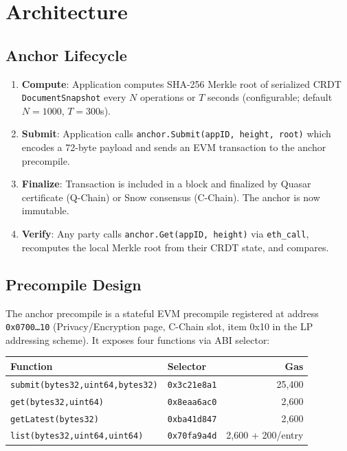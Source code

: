\section{Architecture}

\label{sec:architecture}

\subsection{Anchor Lifecycle}

\begin{enumerate}[nosep]
  \item \textbf{Compute}: Application computes SHA-256 Merkle root of
        serialized CRDT \texttt{DocumentSnapshot} every $N$ operations or
        $T$ seconds (configurable; default $N=1000$, $T=300$s).
  \item \textbf{Submit}: Application calls
        \texttt{anchor.Submit(appID, height, root)} which encodes a
        72-byte payload and sends an EVM transaction to the anchor
        precompile.
  \item \textbf{Finalize}: Transaction is included in a block and
        finalized by Quasar certificate (Q-Chain) or Snow consensus
        (C-Chain). The anchor is now immutable.
  \item \textbf{Verify}: Any party calls \texttt{anchor.Get(appID, height)}
        via \texttt{eth\_call}, recomputes the local Merkle root from their
        CRDT state, and compares.
\end{enumerate}

\subsection{Precompile Design}

The anchor precompile is a stateful EVM precompile registered at address
\texttt{0x0700\ldots10} (Privacy/Encryption page, C-Chain slot, item 0x10
in the LP addressing scheme). It exposes four functions via ABI selector:

\begin{center}
\begin{tabular}{llr}
\toprule
\textbf{Function} & \textbf{Selector} & \textbf{Gas} \\
\midrule
\texttt{submit(bytes32,uint64,bytes32)} & \texttt{0x3c21e8a1} & 25,400 \\
\texttt{get(bytes32,uint64)} & \texttt{0x8eaa6ac0} & 2,600 \\
\texttt{getLatest(bytes32)} & \texttt{0xba41d847} & 2,600 \\
\texttt{list(bytes32,uint64,uint64)} & \texttt{0x70fa9a4d} & 2,600 + 200/entry \\
\bottomrule
\end{tabular}
\end{center}

